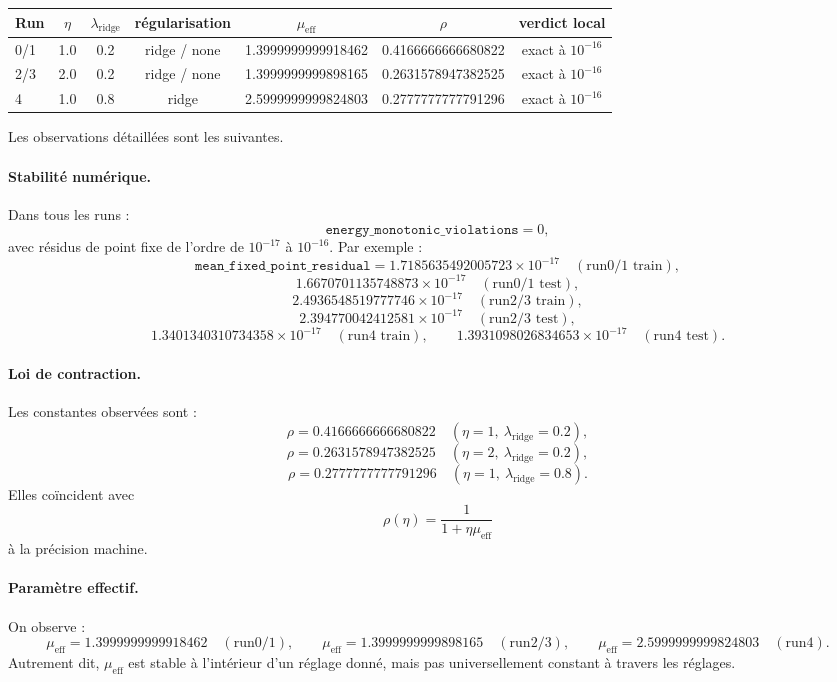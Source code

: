 \begin{center}
\small
\begin{tabular}{lcccccc}
\hline
Run & \(\eta\) & \(\lambda_{\mathrm{ridge}}\) & régularisation & \(\mu_{\mathrm{eff}}\) & \(\rho\) & verdict local \\
\hline
0/1 & 1.0 & 0.2 & ridge / none & 1.3999999999918462 & 0.4166666666680822 & exact à \(10^{-16}\) \\
2/3 & 2.0 & 0.2 & ridge / none & 1.3999999999898165 & 0.2631578947382525 & exact à \(10^{-16}\) \\
4   & 1.0 & 0.8 & ridge & 2.5999999999824803 & 0.2777777777791296 & exact à \(10^{-16}\) \\
\hline
\end{tabular}
\end{center}

Les observations détaillées sont les suivantes.

\paragraph{Stabilité numérique.}
Dans tous les runs :
\[
\texttt{energy\_monotonic\_violations}=0,
\]
avec résidus de point fixe de l’ordre de \(10^{-17}\) à \(10^{-16}\). Par exemple :
\[
\texttt{mean\_fixed\_point\_residual}
=
1.7185635492005723\times 10^{-17}\quad(\text{run0/1 train}),
\]
\[
1.6670701135748873\times 10^{-17}\quad(\text{run0/1 test}),
\]
\[
2.4936548519777746\times 10^{-17}\quad(\text{run2/3 train}),
\]
\[
2.394770042412581\times 10^{-17}\quad(\text{run2/3 test}),
\]
\[
1.3401340310734358\times 10^{-17}\quad(\text{run4 train}),
\qquad
1.3931098026834653\times 10^{-17}\quad(\text{run4 test}).
\]

\paragraph{Loi de contraction.}
Les constantes observées sont :
\[
\rho=0.4166666666680822\quad(\eta=1,\ \lambda_{\mathrm{ridge}}=0.2),
\]
\[
\rho=0.2631578947382525\quad(\eta=2,\ \lambda_{\mathrm{ridge}}=0.2),
\]
\[
\rho=0.2777777777791296\quad(\eta=1,\ \lambda_{\mathrm{ridge}}=0.8).
\]
Elles coïncident avec
\[
\rho(\eta)=\frac{1}{1+\eta\mu_{\mathrm{eff}}}
\]
à la précision machine.

\paragraph{Paramètre effectif.}
On observe :
\[
\mu_{\mathrm{eff}}=1.3999999999918462\quad(\text{run0/1}),
\qquad
\mu_{\mathrm{eff}}=1.3999999999898165\quad(\text{run2/3}),
\qquad
\mu_{\mathrm{eff}}=2.5999999999824803\quad(\text{run4}).
\]
Autrement dit, \(\mu_{\mathrm{eff}}\) est stable à l’intérieur d’un réglage donné, mais pas universellement constant à travers les réglages.

